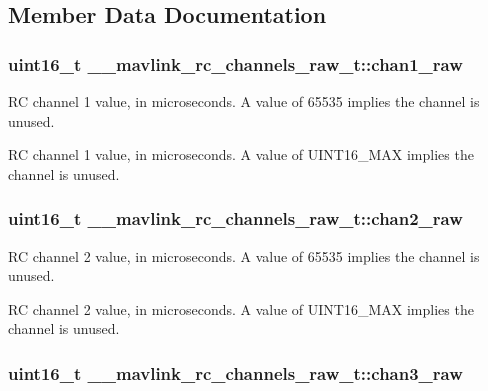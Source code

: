 \subsection{Member Data Documentation}
\hypertarget{struct____mavlink__rc__channels__raw__t_a61bd698c061cfaa1da0b02d3ee390f4e}{
\subsubsection[{chan1\+\_\+raw}]{\setlength{\rightskip}{0pt plus 5cm}uint16\+\_\+t \+\_\+\+\_\+mavlink\+\_\+rc\+\_\+channels\+\_\+raw\+\_\+t\+::chan1\+\_\+raw}}\label{struct____mavlink__rc__channels__raw__t_a61bd698c061cfaa1da0b02d3ee390f4e}


R\+C channel 1 value, in microseconds. A value of 65535 implies the channel is unused. 

R\+C channel 1 value, in microseconds. A value of U\+I\+N\+T16\+\_\+\+M\+A\+X implies the channel is unused. \hypertarget{struct____mavlink__rc__channels__raw__t_a87484f764dc99860781a6a29a07f9a7a}{
\subsubsection[{chan2\+\_\+raw}]{\setlength{\rightskip}{0pt plus 5cm}uint16\+\_\+t \+\_\+\+\_\+mavlink\+\_\+rc\+\_\+channels\+\_\+raw\+\_\+t\+::chan2\+\_\+raw}}\label{struct____mavlink__rc__channels__raw__t_a87484f764dc99860781a6a29a07f9a7a}


R\+C channel 2 value, in microseconds. A value of 65535 implies the channel is unused. 

R\+C channel 2 value, in microseconds. A value of U\+I\+N\+T16\+\_\+\+M\+A\+X implies the channel is unused. \hypertarget{struct____mavlink__rc__channels__raw__t_af56e588a0dcc66fbf2fdb61b5995060c}{
\subsubsection[{chan3\+\_\+raw}]{\setlength{\rightskip}{0pt plus 5cm}uint16\+\_\+t \+\_\+\+\_\+mavlink\+\_\+rc\+\_\+channels\+\_\+raw\+\_\+t\+::chan3\+\_\+raw}}\label{struct____mavlink__rc__channels__raw__t_af56e588a0dcc66fbf2fdb61b5995060c}


